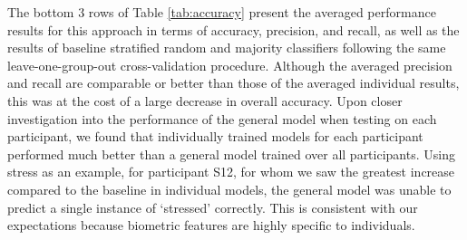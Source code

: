 The bottom 3 rows of Table \ref{tab:accuracy} present the averaged performance results for this approach in terms of accuracy, precision, and recall, as well as the results of baseline stratified random and majority classifiers following the same leave-one-group-out cross-validation procedure. Although the averaged precision and recall are comparable or better than those of the averaged individual results, this was at the cost of a large decrease in overall accuracy.  Upon closer investigation into the performance of the general model when testing on each participant, we found that individually trained models for each participant performed much better than a general model trained over all participants. Using stress as an example, for participant S12, for whom we saw the greatest increase compared to the baseline in individual models, the general model was unable to predict a single instance of `stressed' correctly. This is consistent with our expectations because biometric features are highly specific to individuals.




